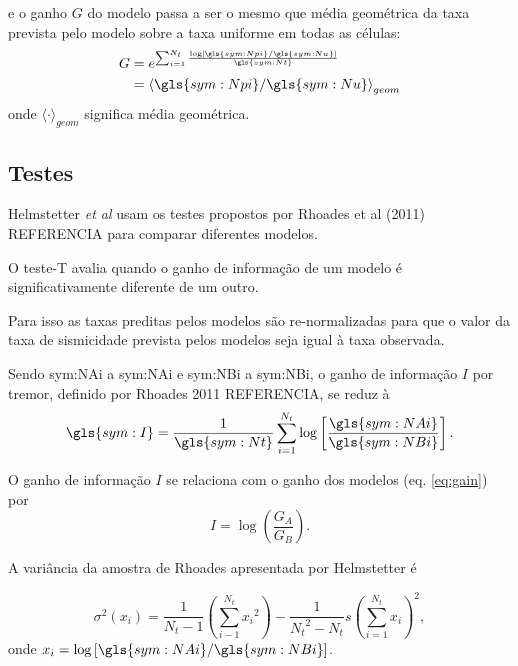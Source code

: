 e o ganho $G$ do modelo passa a ser o mesmo que média geométrica da taxa prevista pelo modelo sobre 
a taxa uniforme em todas as células:
\begin{equation}
	\ensuremath{
	\begin{align}
		G & = e^{\sum_{i = 1}^{N_t}
					\frac{\log \left[  \gls{sym:Npi} / \gls{sym:Nu}  \right]}
						 {\gls{sym:Nt}}
			  } \\
		  & = {\langle  \gls{sym:Npi} / \gls{sym:Nu}  \rangle}_{geom}
	\end{align}}
	\label{eq:G}
\end{equation}
onde $\langle\cdot\rangle_{geom}$ significa média geométrica.

\subsection{Testes}

Helmstetter \emph{et al} usam os testes propostos por Rhoades et al (2011)
REFERENCIA para comparar diferentes modelos.

O teste-T avalia quando o ganho de informação de um modelo é significativamente diferente
de um outro.

Para isso as taxas preditas pelos modelos são re-normalizadas para que o valor da taxa de sismicidade
prevista pelos modelos seja igual à taxa observada.

Sendo \gls{sym:NAi} a \glsdesc{sym:NAi} e \gls{sym:NBi} a \glsdesc{sym:NBi}, o ganho de informação $I$
por tremor, definido por Rhoades 2011 REFERENCIA, se reduz à 
\begin{equation}
	\ensuremath{
		\gls{sym:I} = \frac{1}{\gls{sym:Nt}} 
					  \sum_{i = 1}^{N_t}\log\left[ \frac{\gls{sym:NAi}}
					  								  {\gls{sym:NBi}}  \right].
	}
	\label{eq:gain_info}
\end{equation}

O ganho de informação $I$ se relaciona com o ganho dos modelos (eq. \ref{eq:gain}) por
\begin{equation}
	\ensuremath{
		I = \log\left(\frac{G_A}{G_B}\right).
	}
	\label{eq:gain_info_G}
\end{equation}


A variância da amostra de Rhoades apresentada por Helmstetter é 

\begin{equation}
	\ensuremath{
		\sigma^2(x_i) = 	\frac{1}{N_t - 1}
					{\left(
					\sum_{i-1}^{N_t}
						{x_i}^2 
					\right)}
					- 
					\frac{1}{{N_t}^2 - N_t}s
					{\left(
						\sum_{i=1}^{N_t}{x_i}
					\right)}^2,
	}
	\label{eq:var}
\end{equation}
onde $x_i = \log\left[ \gls{sym:NAi} / \gls{sym:NBi}  \right]$.

